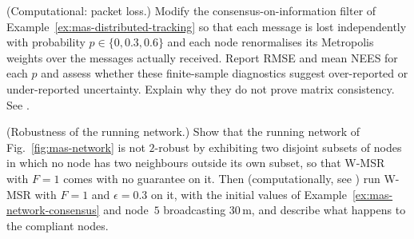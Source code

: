 \begin{prob}\label{prob:ch06:6}
(Computational: packet loss.) Modify the consensus-on-information filter of Example~\ref{ex:mas-distributed-tracking} so that each message is lost independently with probability $p\in\{0,0.3,0.6\}$ and each node renormalises its Metropolis weights over the messages actually received. Report RMSE and mean NEES for each $p$ and assess whether these finite-sample diagnostics suggest over-reported or under-reported uncertainty. Explain why they do not prove matrix consistency. See .
\end{prob}

\begin{prob}\label{prob:ch06:7}
(Robustness of the running network.) Show that the running network of Fig.~\ref{fig:mas-network} is not $2$-robust by exhibiting two disjoint subsets of nodes in which no node has two neighbours outside its own subset, so that W-MSR with $F=1$ comes with no guarantee on it. Then (computationally, see ) run W-MSR with $F=1$ and $\epsilon=0.3$ on it, with the initial values of Example~\ref{ex:mas-network-consensus} and node~$5$ broadcasting $30$\,m, and describe what happens to the compliant nodes.
\end{prob}

